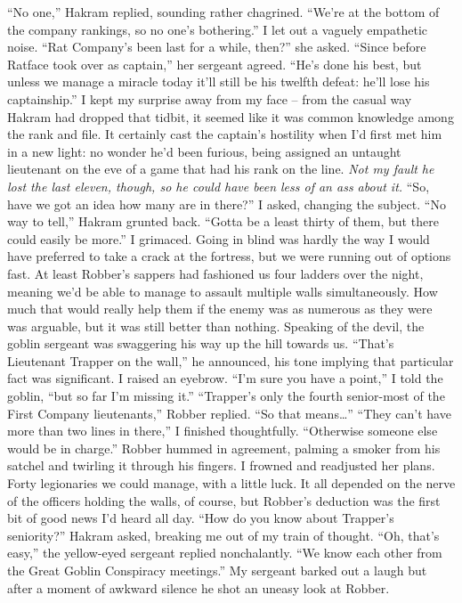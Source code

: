 \documentclass[12pt, openany]{book}
\begin{document}
“No one,” Hakram replied, sounding rather chagrined. “We’re at the bottom of the company rankings, so no one’s bothering.”
I let out a vaguely empathetic noise.
“Rat Company’s been last for a while, then?” she asked.
“Since before Ratface took over as captain,” her sergeant agreed. “He’s done his best, but unless we manage a miracle today it’ll still be his twelfth defeat: he’ll lose his captainship.”
I kept my surprise away from my face – from the casual way Hakram had dropped that tidbit, it seemed like it was common knowledge among the rank and file. It certainly cast the captain’s hostility when I’d first met him in a new light: no wonder he’d been furious, being assigned an untaught lieutenant on the eve of a game that had his rank on the line. \textit{Not my fault he lost the last eleven, though, so he could have been less of an ass about it.}
“So, have we got an idea how many are in there?” I asked, changing the subject.
“No way to tell,” Hakram grunted back. “Gotta be a least thirty of them, but there could easily be more.”
I grimaced. Going in blind was hardly the way I would have preferred to take a crack at the fortress, but we were running out of options fast. At least Robber’s sappers had fashioned us four ladders over the night, meaning we’d be able to manage to assault multiple walls simultaneously. How much that would really help them if the enemy was as numerous as they were was arguable, but it was still better than nothing. Speaking of the devil, the goblin sergeant was swaggering his way up the hill towards us.
“That’s Lieutenant Trapper on the wall,” he announced, his tone implying that particular fact was significant.
I raised an eyebrow.
“I’m sure you have a point,” I told the goblin, “but so far I’m missing it.”
“Trapper’s only the fourth senior-most of the First Company lieutenants,” Robber replied. “So that means…”
“They can’t have more than two lines in there,” I finished thoughtfully. “Otherwise someone else would be in charge.”
Robber hummed in agreement, palming a smoker from his satchel and twirling it through his fingers. I frowned and readjusted her plans. Forty legionaries we could manage, with a little luck. It all depended on the nerve of the officers holding the walls, of course, but Robber’s deduction was the first bit of good news I’d heard all day.
“How do you know about Trapper’s seniority?” Hakram asked, breaking me out of my train of thought.
“Oh, that’s easy,” the yellow-eyed sergeant replied nonchalantly. “We know each other from the Great Goblin Conspiracy meetings.”
My sergeant barked out a laugh but after a moment of awkward silence he shot an uneasy look at Robber.
\end{document}
